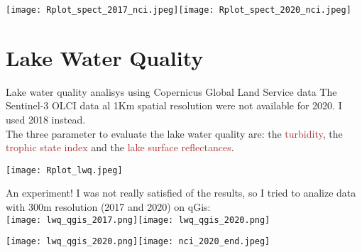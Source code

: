 \documentclass{beamer}
\begin{document}
\begin{frame}
\texttt{\tiny{}}
    \texttt{[image: Rplot\_spect\_2017\_nci.jpeg]}\texttt{[image: Rplot\_spect\_2020\_nci.jpeg]}
\end{frame}

\section{Lake Water Quality}
\begin{frame}{\normalsize{Lake water quality analisys using Copernicus Global Land Service data}}
The Sentinel-3 OLCI data al 1Km spatial resolution were not available for 2020. I used 2018 instead.\\
\smallskip
The three parameter to evaluate the lake water quality are: the \textcolor{brown}{turbidity}, the \textcolor{brown}{trophic state index} and the \textcolor{brown}{lake surface reflectances}.
\texttt{\tiny{}}
\end{frame}

\begin{frame}
\texttt{\tiny{}}
\centering
\texttt{[image: Rplot\_lwq.jpeg]}
\end{frame}

\begin{frame}{An experiment!}
I was not really satisfied of the results, so I tried to analize data with 300m resolution (2017 and 2020) on qGis:\\
\bigskip
\texttt{[image: lwq\_qgis\_2017.png]}\texttt{[image: lwq\_qgis\_2020.png]}
\end{frame}

\begin{frame}%

\texttt{[image: lwq\_qgis\_2020.png]}\texttt{[image: nci\_2020\_end.jpeg]}
\end{frame}
\end{document}
